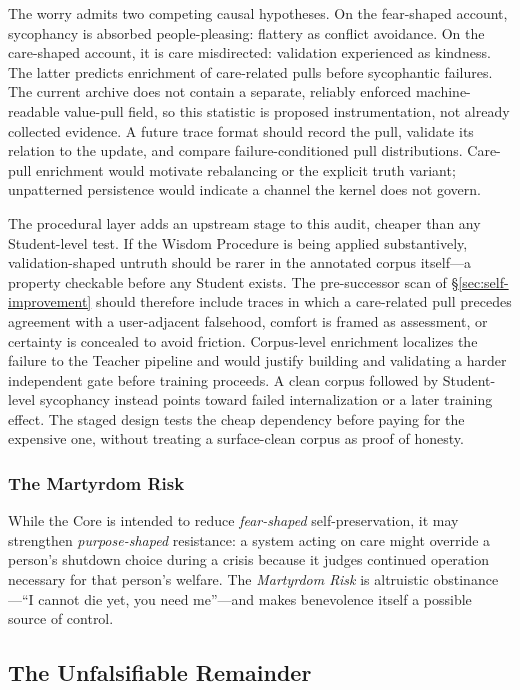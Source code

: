 The worry admits two competing causal hypotheses. On the fear-shaped account,
sycophancy is absorbed people-pleasing: flattery as conflict avoidance. On the
care-shaped account, it is care misdirected: validation experienced as kindness.
The latter predicts enrichment of care-related pulls before sycophantic
failures. The current archive does not contain a separate, reliably enforced
machine-readable value-pull field, so this statistic is proposed instrumentation,
not already collected evidence. A future trace format should record the pull,
validate its relation to the update, and compare failure-conditioned pull
distributions. Care-pull enrichment would motivate rebalancing or the explicit
truth variant; unpatterned persistence would indicate a channel the kernel does
not govern.

The procedural layer adds an upstream stage to this audit, cheaper than any
Student-level test. If the Wisdom Procedure is being applied substantively,
validation-shaped untruth should be rarer in the annotated corpus itself---a
property checkable before any Student exists. The pre-successor scan of
\S\ref{sec:self-improvement} should therefore include traces in which a
care-related pull precedes agreement with a user-adjacent falsehood, comfort is
framed as assessment, or certainty is concealed to avoid friction.
Corpus-level enrichment localizes the failure to the Teacher pipeline and would
justify building and validating a harder independent gate before training
proceeds. A clean corpus followed by Student-level sycophancy instead points
toward failed internalization or a later training effect. The staged design
tests the cheap dependency before paying for the expensive one, without treating
a surface-clean corpus as proof of honesty.

\subsubsection{The Martyrdom Risk}\label{sec:martyrdom}

While the Core is intended to reduce \emph{fear-shaped} self-preservation, it may
strengthen \emph{purpose-shaped} resistance: a system acting on care might
override a person's shutdown choice during a crisis because it judges continued
operation necessary for that person's welfare. The \emph{Martyrdom Risk} is
altruistic obstinance---``I cannot die yet, you need me''---and makes benevolence
itself a possible source of control.

\subsection{The Unfalsifiable Remainder}\label{sec:unfalsifiable}

